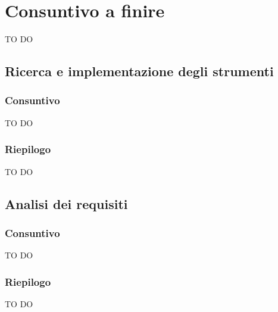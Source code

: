 %


\section{Consuntivo a finire} %
\label{sec:consuntivo_a_finire}
TO DO
	\subsection{Ricerca e implementazione degli strumenti} %
	\label{sub:ricerca_e_implementazione_degli_strumenti}
		\subsubsection{Consuntivo} %
		\label{ssub:consuntivo}
		TO DO
		
		\subsubsection{Riepilogo} %
		\label{ssub:riepilogo}
		TO DO
		

	\subsection{Analisi dei requisiti} %
	\label{sub:analisi_dei_requisiti}
		\subsubsection{Consuntivo} %
		\label{ssub:consuntivo}
		TO DO
	
		\subsubsection{Riepilogo} %
		\label{ssub:riepilogo}
		TO DO
		

